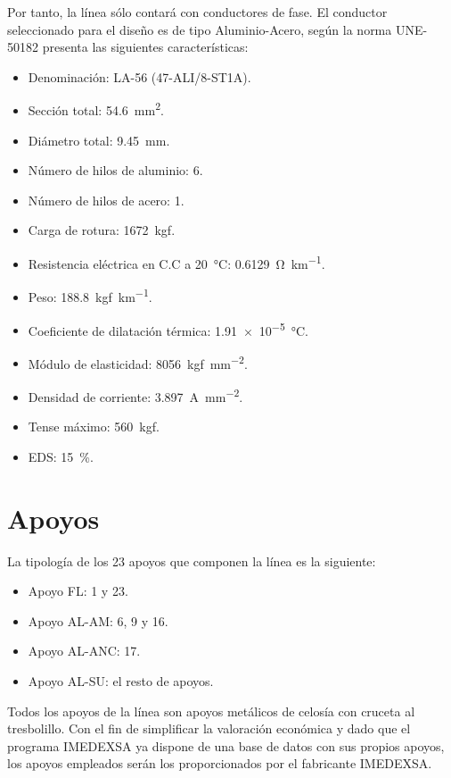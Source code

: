 Por tanto, la línea sólo contará con conductores de fase. El conductor seleccionado para el diseño es de tipo Aluminio-Acero, según la norma UNE-50182 presenta las siguientes características:
\begin{itemize}
  \item Denominación: LA-56 (47-ALI/8-ST1A).
  \item Sección total: \SI{54.6}{\milli\meter\squared}.
  \item Diámetro total: \SI{9.45}{mm}.
  \item Número de hilos de aluminio: 6.
  \item Número de hilos de acero: 1.
  \item Carga de rotura: \SI{1672}{kgf}.
  \item Resistencia eléctrica en C.C a \SI{20}{\celsius}: \SI{0.6129}{\ohm\per\kilo\metre}.
  \item Peso: \SI{188.8}{kgf\per\kilo\metre}.
  \item Coeficiente de dilatación térmica: \SI{1.91e-5}{\celsius}.
  \item Módulo de elasticidad: \SI{8056}{kgf\per\milli\meter\squared}.
  \item Densidad de corriente: \SI{3.897}{\ampere\per\milli\meter\squared}.
  \item Tense máximo: \SI{560}{kgf}.
  \item EDS: \SI{15}{\percent}.
\end{itemize}
\section{Apoyos}
\label{sec:md-apoyos}
La tipología de los 23 apoyos que componen la línea es la siguiente:
\begin{itemize}
  \item Apoyo \ac{FL}: 1 y 23.
  \item Apoyo \ac{AL-AM}: 6, 9 y 16.
  \item Apoyo \ac{AL-ANC}: 17.
  \item Apoyo \ac{AL-SU}: el resto de apoyos.
\end{itemize}
\clearpage
Todos los apoyos de la línea son apoyos metálicos de celosía con cruceta al tresbolillo. Con el fin de simplificar la valoración económica y dado que el programa IMEDEXSA ya dispone de una base de datos con sus propios apoyos, los apoyos empleados serán los proporcionados por el fabricante IMEDEXSA.

